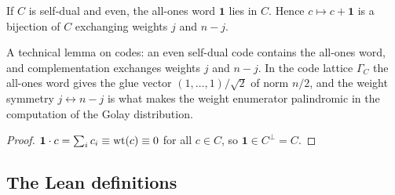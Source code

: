 \begin{lemma}\label{ch02:lem:allones}
If $C$ is self-dual and even, the all-ones word $\mathbf 1$ lies in $C$.  Hence
$c\mapsto c+\mathbf 1$ is a bijection of $C$ exchanging weights $j$ and $n-j$.
\end{lemma}
\begin{physics}
A technical lemma on codes: an even self-dual code contains the all-ones word, and complementation exchanges weights $j$ and $n-j$. In the code lattice $\Gamma_C$ the all-ones word gives the glue vector $(1,\dots,1)/\sqrt2$ of norm $n/2$, and the weight symmetry $j\leftrightarrow n-j$ is what makes the weight enumerator palindromic in the computation of the Golay distribution.
\end{physics}
\begin{proof}
$\mathbf 1\cdot c=\sum_ic_i\equiv\operatorname{wt}(c)\equiv0$ for all $c\in C$, so $\mathbf 1\in
C^\perp=C$.
\end{proof}

\subsection{The Lean definitions}

